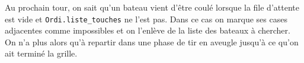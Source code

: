 Au prochain tour, on sait qu'un bateau vient d'être coulé lorsque la file d'attente est vide et \texttt{Ordi.liste\_touches} ne l'est pas. Dans ce cas on marque ses cases adjacentes comme impossibles et on l'enlève de la liste des bateaux à chercher. On n'a plus alors qu'à repartir dans une phase de tir en aveugle jusqu'à ce qu'on ait terminé la grille.
%
